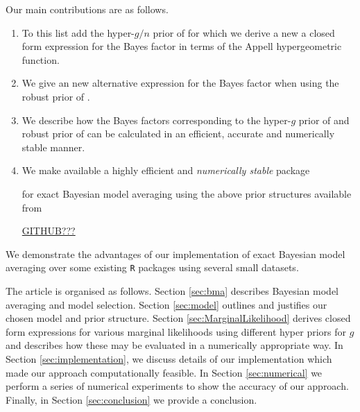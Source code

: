 Our main contributions are as follows.
\begin{enumerate}
	\item To this list add the  hyper-$g/n$ prior of \cite{Liang2008} for which we
	derive a new
	a closed form expression for the Bayes factor in terms
	of the Appell hypergeometric function.
	
	\item We give an new alternative expression for the Bayes factor when using the
	robust prior of \cite{Bayarri2012}.
	
	\item We describe how the  Bayes factors corresponding to the hyper-$g$ prior of \cite{Liang2008} and robust 
	prior of \cite{Bayarri2012} can be calculated in an efficient, accurate and numerically stable manner.
	
	\item We make available a highly efficient and {\it numerically stable} package 
	

	for exact Bayesian model averaging
	using the above prior structures available from
	
	\begin{center}
	\url{GITHUB???}
	\end{center}
\end{enumerate}

\noindent 
We demonstrate the advantages of our implementation of exact Bayesian model
averaging over some existing {\tt R}
packages using several small datasets.



The article is organised as follows. Section \ref{sec:bma} describes Bayesian model averaging and model
selection. Section \ref{sec:model} outlines and justifies our chosen model and prior structure. Section 
\ref{sec:MarginalLikelihood} derives closed form expressions for various marginal likelihoods using 
different hyper priors for $g$ and describes how these may be evaluated in a numerically appropriate way.
In Section \ref{sec:implementation}, we discuss details of our implementation which made our approach 
computationally feasible.
In Section \ref{sec:numerical} we perform a series of numerical experiments to show the accuracy of our approach. 
Finally, in Section \ref{sec:conclusion} we provide a conclusion.









